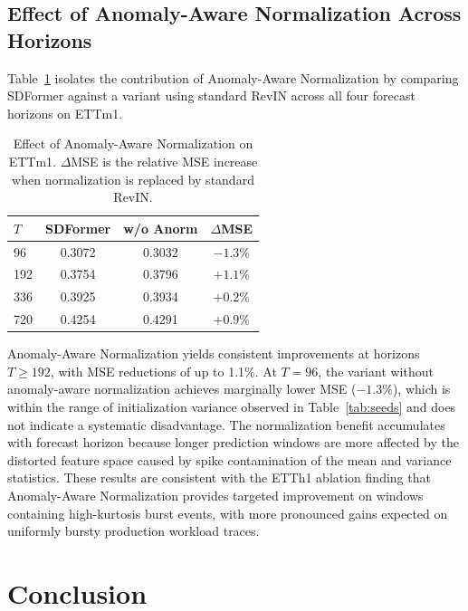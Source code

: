 \documentclass[journal]{IEEEtran}
\begin{document}
\subsection{Effect of Anomaly-Aware Normalization Across Horizons}

Table~\ref{tab:anorm} isolates the contribution of Anomaly-Aware
Normalization by comparing SDFormer against a variant using standard RevIN
across all four forecast horizons on ETTm1.

\begin{table}[!t]
\caption{Effect of Anomaly-Aware Normalization on ETTm1.
  $\Delta$MSE is the relative MSE increase when normalization is replaced
  by standard RevIN.}
\label{tab:anorm}
\centering
\renewcommand{\arraystretch}{1.15}
\begin{tabular}{lccc}
\toprule
$T$ & \textbf{SDFormer} & \textbf{w/o Anorm} & $\Delta$\textbf{MSE} \\
\midrule
96  & 0.3072 & 0.3032 & $-1.3\%$ \\
192 & 0.3754 & 0.3796 & $+1.1\%$ \\
336 & 0.3925 & 0.3934 & $+0.2\%$ \\
720 & 0.4254 & 0.4291 & $+0.9\%$ \\
\bottomrule
\end{tabular}
\end{table}

Anomaly-Aware Normalization yields consistent improvements at horizons
$T \geq 192$, with MSE reductions of up to 1.1\%.
At $T = 96$, the variant without anomaly-aware normalization achieves
marginally lower MSE ($-1.3\%$), which is within the range of
initialization variance observed in Table~\ref{tab:seeds} and does not
indicate a systematic disadvantage.
The normalization benefit accumulates with forecast horizon because longer
prediction windows are more affected by the distorted feature space caused
by spike contamination of the mean and variance statistics.
These results are consistent with the ETTh1 ablation finding that
Anomaly-Aware Normalization provides targeted improvement on windows
containing high-kurtosis burst events, with more pronounced gains expected
on uniformly bursty production workload traces.

\section{Conclusion}
\label{sec:conclusion}
\end{document}
